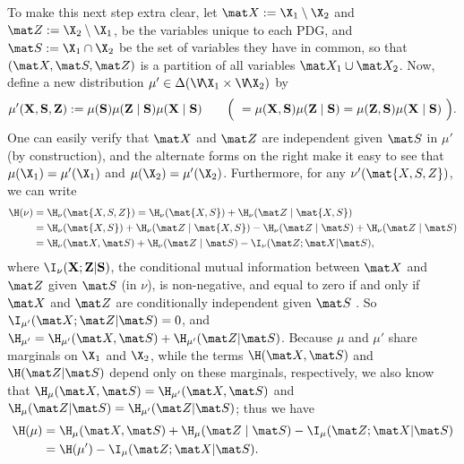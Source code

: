 \begin{lproof}
    To make this next step extra clear, let $\mat X := \X_1 \setminus \X_2$ and
    $\mat Z := \X_2 \setminus \X_1$, be the variables unique to each PDG, and $\mat S:= \X_1 \cap \X_2$ be the set of variables they have in common, so that $(\mat X, \mat S, \mat Z)$ is a partition of all variables $\mat X_1 \cup \mat X_2$.
    Now, define a new distribution $\mu' \in \Delta(\V\!\X_1 \times \V\!\X_2)$ by
    \[
        \bf
        \mu'( X,  S,  Z) 
            := \mu(S) \mu( Z \mid  S)\mu( X \mid  S)
            \qquad \Big(~
            = \mu( X,  S) \mu( Z \mid  S)
            = \mu( Z,  S) \mu( X \mid  S)~\Big).
    \]
    One can easily verify that $\mat X$ and $\mat Z$ are independent given $\mat S$ in $\mu'$ (by construction), and the alternate forms on the right make it easy to see that $\mu(\X_1) = \mu'(\X_1)$ and $\mu(\X_2) = \mu'(\X_2)$.
    Furthermore, for any $\nu'(\mat{X,S,Z})$, we can write
    \begin{align*}
        \H( \nu ) &=  \H_\nu(\mat{X,S,Z}) =
            \H_\nu(\mat{X,S}) + \H_\nu(\mat Z \mid \mat{X,S}) \\
            &= \H_\nu(\mat{X,S}) + \H_\nu(\mat Z \mid \mat{X,S}) - \H_\nu(\mat Z \mid \mat S) + \H_\nu(\mat Z \mid \mat S) \\
            &= \H_\nu(\mat X,\mat S) + \H_\nu(\mat Z \mid \mat S) - \I_\nu(\mat Z; \mat X| \mat S),
    \end{align*}
    where $\I_\nu(\bf X;Z|S)$, the conditional mutual information between $\mat X$ and $\mat Z$ given $\mat S$ (in $\nu$), is non-negative, and equal to zero if and only if $\mat X$ and $\mat Z$ are conditionally independent given $\mat S$ \parencite[see, for instance,][\S1]{mackay2003information}. 
    So $\I_{\mu'}(\mat X; \mat Z| \mat S) = 0$, and
        $\H_{\mu'} = \H_{\mu'}(\mat X, \mat S) + \H_{\mu'}(\mat Z| \mat S)$. 
    Because $\mu$ and $\mu'$ share marginals on $\X_1$ and $\X_2$, while the terms $\H(\mat X, \mat S)$ and $\H(\mat Z|\mat S)$ depend only on these marginals, respectively, we also know that $\H_{\mu}(\mat X, \mat S) = \H_{\mu'}(\mat X, \mat S)$ and $\H_{\mu}(\mat Z | \mat S) = \H_{\mu'}(\mat Z| \mat S)$; thus we have
    \begin{align*}
        \H(\mu) &= \H_\mu(\mat X,\mat S) + \H_\mu(\mat Z \mid \mat S) - \I_\mu(\mat Z; \mat X| \mat S) \\
            &= \H(\mu') - \I_\mu(\mat Z; \mat X| \mat S).

\end{align*}
\end{lproof}
